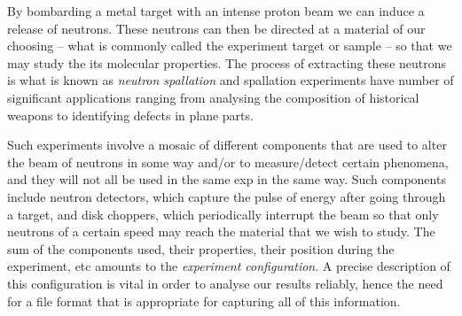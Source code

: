 By bombarding a metal target with an intense proton beam we can induce a release of neutrons. These neutrons can then be directed at a material of our choosing -- what is commonly called the experiment target or sample -- so that we may study the its molecular properties. The process of extracting these neutrons is what is known as \textit{neutron spallation} and spallation experiments have number of significant applications ranging from analysing the composition of historical weapons to identifying defects in plane parts.

Such experiments involve a mosaic of different components that are used to alter the beam of neutrons in some way and/or to measure/detect certain phenomena, and they will not all be used in the same exp in the same way. Such components include neutron detectors, which capture the pulse of energy after going through a target, and disk choppers, which periodically interrupt the beam so that only neutrons of a certain speed may reach the material that we wish to study. The sum of the components used, their properties, their position during the experiment, etc amounts to the \textit{experiment configuration}. A precise description of this configuration is vital in order to analyse our results reliably, hence the need for a file format that is appropriate for capturing all of this information.
